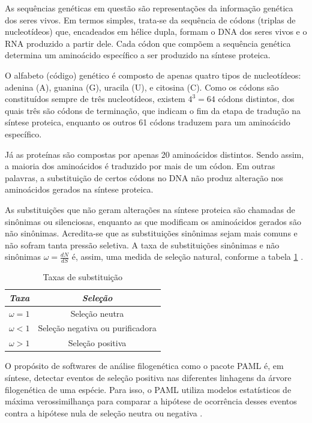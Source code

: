 \documentclass[cic,tc]{iiufrgs}
\begin{document}
As sequências genéticas em questão são representações da informação genética
dos seres vivos. Em termos simples, trata-se da sequência de códons (triplas de
nucleotídeos) que, encadeados em hélice dupla, formam o DNA dos seres vivos e o
RNA produzido a partir dele. Cada códon que compõem a sequência genética
determina um aminoácido específico a ser produzido na síntese proteica.

O alfabeto (código) genético é composto de apenas quatro tipos de nucleotídeos:
adenina (A), guanina (G), uracila (U), e citosina (C). Como os códons são
constituídos sempre de três nucleotídeos, existem $4^3 = 64$ códons distintos,
dos quais três são códons de terminação, que indicam o fim da etapa de tradução
na síntese proteica, enquanto os outros 61 códons traduzem para um aminoácido
específico.

Já as proteínas são compostas por apenas 20 aminoácidos distintos. Sendo assim,
a maioria dos aminoácidos é traduzido por mais de um códon. Em outras palavras,
a substituição de certos códons no DNA não produz alteração nos aminoácidos
gerados na síntese proteica.

As substituições que não geram alterações na síntese proteica são chamadas de
sinônimas ou silenciosas, enquanto as que modificam os aminoácidos gerados são
não sinônimas. Acredita-se que as substituições sinônimas sejam mais comuns e
não sofram tanta pressão seletiva. A taxa de substituições sinônimas e não
sinônimas $\omega = \frac{dN}{dS}$ é, assim, uma medida de seleção natural,
conforme a tabela \ref{tbl:ex1} \cite{yang2002codon}.

\begin{table}[h]
    \caption{Taxas de substituição}
    \centering
        \begin{tabular}{c|c}
          \hline
          \textit{Taxa}  &   \textit{Seleção} \\
          \hline
          \hline
          $\omega = 1$ & Seleção neutra \\
          $\omega < 1$ & Seleção negativa ou purificadora \\
          $\omega > 1$ & Seleção positiva \\
          \hline
        \end{tabular}
    \label{tbl:ex1}
\end{table}

O propósito de softwares de análise filogenética como o pacote PAML é, em
síntese, detectar eventos de seleção positiva nas diferentes linhagens da
árvore filogenética de uma espécie. Para isso, o PAML utiliza modelos
estatísticos de máxima verossimilhança para comparar a hipótese de ocorrência
desses eventos contra a hipótese nula de seleção neutra ou
negativa \cite{moretti2012gcodeml}.
\end{document}
